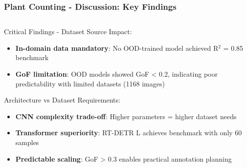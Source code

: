 \documentclass[aspectratio=43]{beamer}
\begin{document}
\begin{frame}
    \frametitle{\small Plant Counting - Discussion: Key Findings}
    
    \begin{columns}
        \begin{column}{0.5\textwidth}
            \begin{block}{Critical Findings - Dataset Source Impact:}
                \scriptsize
                \begin{itemize}
                    \item \textbf{In-domain data mandatory}: No OOD-trained model achieved R\ensuremath{^2} = 0.85 benchmark
                    \item \textbf{GoF limitation}: OOD models showed GoF < 0.2, indicating poor predictability with limited datasets (1168 images)
                \end{itemize}
            \end{block}
            
            \begin{exampleblock}{Architecture vs Dataset Requirements:}
                \scriptsize
                \begin{itemize}
                    \item \textbf{CNN complexity trade-off}: Higher parameters = higher dataset needs
                    \item \textbf{Transformer superiority}: RT-DETR L achieves benchmark with only 60 samples 
                    \item \textbf{Predictable scaling}: GoF > 0.3 enables practical annotation planning
                \end{itemize}
            \end{exampleblock}
            
        \end{column}
        

\end{columns}
\end{frame}
\end{document}
